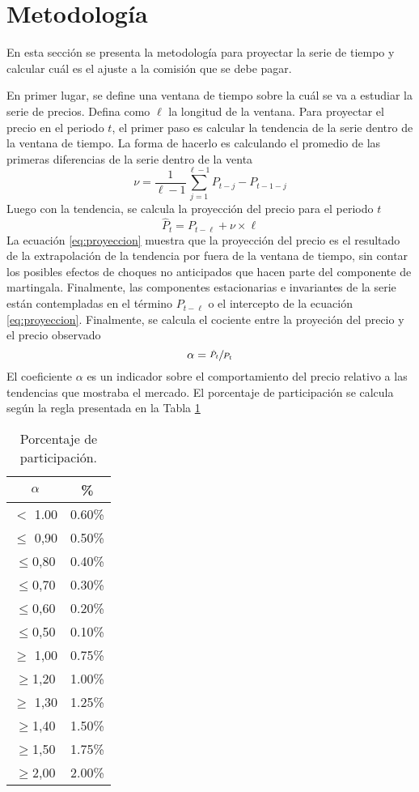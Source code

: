 \documentclass{article}
\begin{document}
\section{Metodología}

En esta sección se presenta la metodología para proyectar la serie de tiempo y calcular cuál es el ajuste a la comisión que se debe pagar. 

En primer lugar, se define una ventana de tiempo sobre la cuál se va a estudiar la serie de precios. Defina como $\ell$ la longitud de la ventana. Para proyectar el precio en el periodo $t$, el primer paso es calcular la tendencia de la serie dentro de la ventana de tiempo. La forma de hacerlo es calculando el promedio de las primeras diferencias de la serie dentro de la venta
\begin{equation}
    \nu = \frac{1}{\ell-1} \sum_{j=1}^{\ell-1}P_{t-j}-P_{t-1-j} 
\end{equation}
Luego con la tendencia, se calcula la proyección del precio para el periodo $t$
\begin{equation}\label{eq:proyeccion}
    \hat{P}_t = P_{t-\ell} + \nu\times\ell 
\end{equation}
La ecuación \eqref{eq:proyeccion} muestra que la proyección del precio es el resultado de la extrapolación de la tendencia por fuera de la ventana de tiempo, sin contar los posibles efectos de choques no anticipados que hacen parte del componente de martingala. Finalmente, las componentes estacionarias e invariantes de la serie están contempladas en el término $P_{t-\ell}$ o el intercepto de la ecuación \eqref{eq:proyeccion}. Finalmente, se calcula el cociente entre la proyeción del precio y el precio observado
\begin{equation}
    \alpha = \sfrac{\hat{P}_t}{P_t}
\end{equation}
El coeficiente $\alpha$ es un indicador sobre el comportamiento del precio relativo a las tendencias que mostraba el mercado. El porcentaje de participación se calcula según la regla presentada en la Tabla \ref{tab:my_label}
\begin{table}[hbt]
    \centering
    \caption{Porcentaje de participación.}
    \label{tab:my_label}
    \begin{tabular}{c|c}\hline\hline
        $\alpha$ & \%  \\ \hline
        $<$ 1.00	& 0.60\% \\ 
        $\leq$ 0,90	& 0.50\% \\ 
        $\leq$0,80	& 0.40\% \\ 
 $\leq$0,70	& 0.30\% \\ 
 $\leq$0,60	& 0.20\% \\ 
 $\leq$0,50	& 0.10\% \\
$\geq$ 1,00	& 0.75\% \\ 
$\geq$1,20	& 1.00\% \\ 
$\geq$ 1,30	& 1.25\% \\
$\geq$1,40	& 1.50\% \\
$\geq$1,50	& 1.75\% \\ 
$\geq$2,00	& 2.00\%  \\ 
\hline
    \end{tabular}
\end{table}


\newpage


\end{document}
